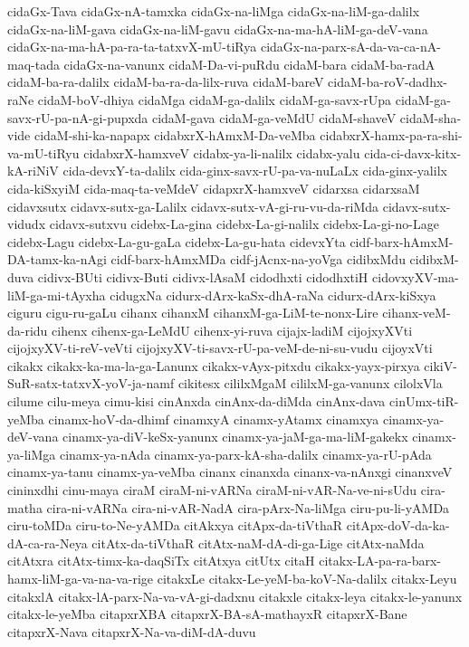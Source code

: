 {cidaGx-Tava
cidaGx-nA-tamxka
cidaGx-na-liMga
cidaGx-na-liM-ga-dalilx
cidaGx-na-liM-gava
cidaGx-na-liM-gavu
cidaGx-na-ma-hA-liM-ga-deV-vana
cidaGx-na-ma-hA-pa-ra-ta-tatxvX-mU-tiRya
cidaGx-na-parx-sA-da-va-ca-nA-maq-tada
cidaGx-na-vanunx
cidaM-Da-vi-puRdu
cidaM-bara
cidaM-ba-radA
cidaM-ba-ra-dalilx
cidaM-ba-ra-da-lilx-ruva
cidaM-bareV
cidaM-ba-roV-dadhx-raNe
cidaM-boV-dhiya
cidaMga
cidaM-ga-dalilx
cidaM-ga-savx-rUpa
cidaM-ga-savx-rU-pa-nA-gi-pupxda
cidaM-gava
cidaM-ga-veMdU
cidaM-shaveV
cidaM-sha-vide
cidaM-shi-ka-napapx
cidabxrX-hAmxM-Da-veMba
cidabxrX-hamx-pa-ra-shi-va-mU-tiRyu
cidabxrX-hamxveV
cidabx-ya-li-nalilx
cidabx-yalu
cida-ci-davx-kitx-kA-riNiV
cida-devxY-ta-dalilx
cida-ginx-savx-rU-pa-va-nuLaLx
cida-ginx-yalilx
cida-kiSxyiM
cida-maq-ta-veMdeV
cidapxrX-hamxveV
cidarxsa
cidarxsaM
cidavxsutx
cidavx-sutx-ga-Lalilx
cidavx-sutx-vA-gi-ru-vu-da-riMda
cidavx-sutx-vidudx
cidavx-sutxvu
cidebx-La-gina
cidebx-La-gi-nalilx
cidebx-La-gi-no-Lage
cidebx-Lagu
cidebx-La-gu-gaLa
cidebx-La-gu-hata
cidevxYta
cidf-barx-hAmxM-DA-tamx-ka-nAgi
cidf-barx-hAmxMDa
cidf-jAcnx-na-yoVga
cidibxMdu
cidibxM-duva
cidivx-BUti
cidivx-Buti
cidivx-lAsaM
cidodhxti
cidodhxtiH
cidovxyXV-ma-liM-ga-mi-tAyxha
cidugxNa
cidurx-dArx-kaSx-dhA-raNa
cidurx-dArx-kiSxya
ciguru
cigu-ru-gaLu
cihanx
cihanxM
cihanxM-ga-LiM-te-nonx-Lire
cihanx-veM-da-ridu
cihenx
cihenx-ga-LeMdU
cihenx-yi-ruva
cijajx-ladiM
cijojxyXVti
cijojxyXV-ti-reV-veVti
cijojxyXV-ti-savx-rU-pa-veM-de-ni-su-vudu
cijoyxVti
cikakx
cikakx-ka-ma-la-ga-Lanunx
cikakx-vAyx-pitxdu
cikakx-yayx-pirxya
cikiV-SuR-satx-tatxvX-yoV-ja-namf
cikitesx
cililxMgaM
cililxM-ga-vanunx
cilolxVla
cilume
cilu-meya
cimu-kisi
cinAnxda
cinAnx-da-diMda
cinAnx-dava
cinUmx-tiR-yeMba
cinamx-hoV-da-dhimf
cinamxyA
cinamx-yAtamx
cinamxya
cinamx-ya-deV-vana
cinamx-ya-diV-keSx-yanunx
cinamx-ya-jaM-ga-ma-liM-gakekx
cinamx-ya-liMga
cinamx-ya-nAda
cinamx-ya-parx-kA-sha-dalilx
cinamx-ya-rU-pAda
cinamx-ya-tanu
cinamx-ya-veMba
cinanx
cinanxda
cinanx-va-nAnxgi
cinanxveV
cininxdhi
cinu-maya
ciraM
ciraM-ni-vARNa
ciraM-ni-vAR-Na-ve-ni-sUdu
cira-matha
cira-ni-vARNa
cira-ni-vAR-NadA
cira-pArx-Na-liMga
ciru-pu-li-yAMDa
ciru-toMDa
ciru-to-Ne-yAMDa
citAkxya
citApx-da-tiVthaR
citApx-doV-da-ka-dA-ca-ra-Neya
citAtx-da-tiVthaR
citAtx-naM-dA-di-ga-Lige
citAtx-naMda
citAtxra
citAtx-timx-ka-daqSiTx
citAtxya
citUtx
citaH
citakx-LA-pa-ra-barx-hamx-liM-ga-va-na-va-rige
citakxLe
citakx-Le-yeM-ba-koV-Na-dalilx
citakx-Leyu
citakxlA
citakx-lA-parx-Na-va-vA-gi-dadxnu
citakxle
citakx-leya
citakx-le-yanunx
citakx-le-yeMba
citapxrXBA
citapxrX-BA-sA-mathayxR
citapxrX-Bane
citapxrX-Nava
citapxrX-Na-va-diM-dA-duvu
}
